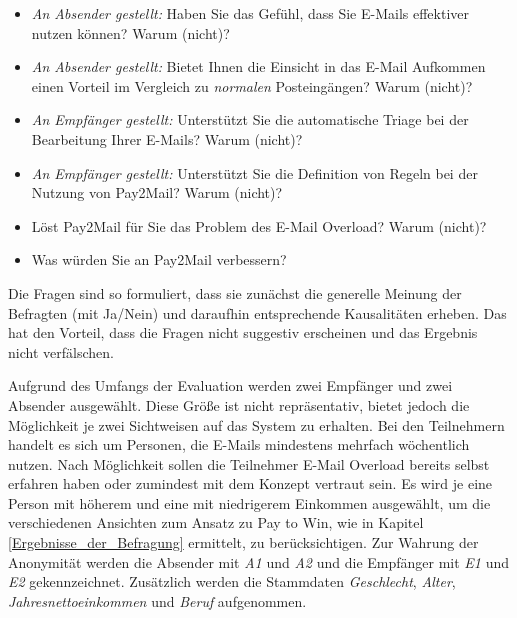 \begin{itemize}
\item \textit{An Absender gestellt:} Haben Sie das Gefühl, dass Sie E-Mails effektiver nutzen können? Warum (nicht)?
\item \textit{An Absender gestellt:} Bietet Ihnen die Einsicht in das E-Mail Aufkommen einen Vorteil im Vergleich zu \textit{normalen} Posteingängen? Warum (nicht)?
\item \textit{An Empfänger gestellt:} Unterstützt Sie die automatische Triage bei der Bearbeitung Ihrer E-Mails? Warum (nicht)?
\item \textit{An Empfänger gestellt:} Unterstützt Sie die Definition von Regeln bei der Nutzung von Pay2Mail? Warum (nicht)?
\item Löst Pay2Mail für Sie das Problem des E-Mail Overload? Warum (nicht)?
\item Was würden Sie an Pay2Mail verbessern? 
\end{itemize}

\noindent Die Fragen sind so formuliert, dass sie zunächst die generelle Meinung der Befragten (mit Ja/Nein) und daraufhin entsprechende Kausalitäten erheben. Das hat den Vorteil, dass die Fragen nicht suggestiv erscheinen und das Ergebnis nicht verfälschen.

Aufgrund des Umfangs der Evaluation werden zwei Empfänger und zwei Absender ausgewählt. Diese Größe ist nicht repräsentativ, bietet jedoch die Möglichkeit je zwei Sichtweisen auf das System zu erhalten. Bei den Teilnehmern handelt es sich um Personen, die E-Mails mindestens mehrfach wöchentlich nutzen. Nach Möglichkeit sollen die Teilnehmer E-Mail Overload bereits selbst erfahren haben oder zumindest mit dem Konzept vertraut sein. Es wird je eine Person mit höherem und eine mit niedrigerem Einkommen ausgewählt, um die verschiedenen Ansichten zum Ansatz zu Pay to Win, wie in Kapitel \ref{Ergebnisse_der_Befragung} ermittelt, zu berücksichtigen. Zur Wahrung der Anonymität werden die Absender mit \textit{A1} und \textit{A2} und die Empfänger mit \textit{E1} und \textit{E2} gekennzeichnet. Zusätzlich werden die Stammdaten \textit{Geschlecht}, \textit{Alter}, \textit{Jahresnettoeinkommen} und \textit{Beruf} aufgenommen.


